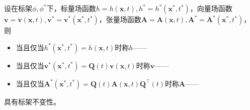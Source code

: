 \documentclass[main.tex]{subfiles}
\begin{document}
设在标架$\phi,\phi^*$下，标量场函数$h=h\left(\mathbf{x},t\right),h^*=h^*\left(\mathbf{x}^*,t^*\right)$，向量场函数$\mathbf{v}=\mathbf{v}\left(\mathbf{x},t\right),\mathbf{v}^*=\mathbf{v}^*\left(\mathbf{x}^*,t^*\right)$，张量场函数$\mathbf{A}=\mathbf{A}\left(\mathbf{x},t\right),\mathbf{A}^*=\mathbf{A}^*\left(\mathbf{x}^*,t^*\right)$，则
\begin{itemize}
    \item 当且仅当$h^*\left(\mathbf{x}^*,t^*\right)=h\left(\mathbf{x},t\right)$时称$h$——
    \item 当且仅当$\mathbf{v}^*\left(\mathbf{x}^*,t^*\right)=\mathbf{Q}\left(t\right)\mathbf{v}\left(\mathbf{x},t\right)$时称$\mathbf{v}$——
    \item 当且仅当$\mathbf{A}^*\left(\mathbf{x}^*,t^*\right)=\mathbf{Q}\left(t\right)\mathbf{A}\left(\mathbf{x},t\right)\mathbf{Q}^\intercal\left(t\right)$时称$\mathbf{A}$——
\end{itemize}
具有标架不变性。
\end{document}

